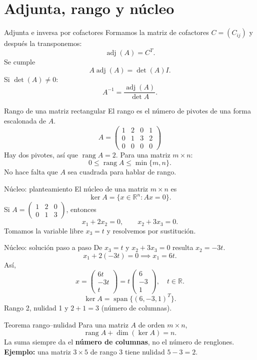 \documentclass[aspectratio=169,11pt]{beamer}
\newcommand{\R}{\mathbb R}
\newcommand{\rang}{\operatorname{rang}}
\begin{document}
\section{Adjunta, rango y núcleo}
\begin{frame}{Adjunta e inversa por cofactores}
Formamos la matriz de cofactores $C=(C_{ij})$ y después la transponemos:
\[\operatorname{adj}(A)=C^T.\]
Se cumple
\[A\operatorname{adj}(A)=\det(A)I.\]
Si $\det(A)\neq0$:
\[\boxed{A^{-1}=\dfrac{\operatorname{adj}(A)}{\det A}}.\]
\end{frame}
\begin{frame}{Rango de una matriz rectangular}
El rango es el número de pivotes de una forma escalonada de $A$.
\[A=\begin{pmatrix}1&2&0&1\\0&1&3&2\\0&0&0&0\end{pmatrix}\]
Hay dos pivotes, así que $\rang A=2$. Para una matriz $m\times n$:
\[0\leq\rang A\leq\min\{m,n\}.\]
No hace falta que $A$ sea cuadrada para hablar de rango.
\end{frame}
\begin{frame}{Núcleo: planteamiento}
El núcleo de una matriz $m\times n$ es
\[\ker A=\{x\in\R^n:Ax=0\}.\]
Si $A=\begin{pmatrix}1&2&0\\0&1&3\end{pmatrix}$, entonces
\[x_1+2x_2=0,\qquad x_2+3x_3=0.\]
Tomamos la variable libre $x_3=t$ y resolvemos por sustitución.
\end{frame}
\begin{frame}{Núcleo: solución paso a paso}
De $x_3=t$ y $x_2+3x_3=0$ resulta $x_2=-3t$.
\[x_1+2(-3t)=0\implies x_1=6t.\]
Así,
\[x=\begin{pmatrix}6t\\-3t\\t\end{pmatrix}=t\begin{pmatrix}6\\-3\\1\end{pmatrix},\quad t\in\R.\]
\[\boxed{\ker A=\operatorname{span}\{(6,-3,1)^T\}}.\]
Rango 2, nulidad 1 y $2+1=3$ (número de columnas).
\end{frame}
\begin{frame}{Teorema rango--nulidad}
Para una matriz $A$ de orden $m\times n$,
\[\boxed{\rang A+\dim(\ker A)=n}.\]
La suma siempre da el \textbf{número de columnas}, no el número de renglones.
\textbf{Ejemplo:} una matriz $3\times5$ de rango $3$ tiene nulidad $5-3=2$.
\end{frame}
\end{document}
